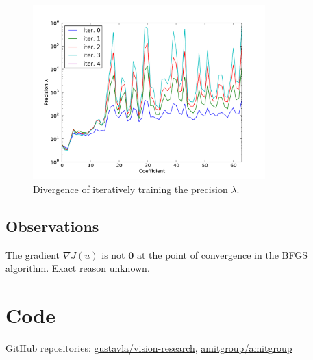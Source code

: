 \documentclass{article}
\begin{document}
\begin{figure}
    \centering
    \includegraphics[width=0.8\textwidth]{figs/itercoefs.pdf}
    \caption{Divergence of iteratively training the precision $\lambda$.} \label{fig:itercoefs}
\end{figure}

\subsection{Observations}
The gradient $\nabla J(u)$ is not $\mathbf{0}$ at the point of convergence in the BFGS algorithm. Exact reason unknown.

\section{Code}
GitHub repositories: \href{https://github.com/gustavla/vision-research/}{gustavla/vision-research}, \href{https://github.com/amitgroup/amitgroup}{amitgroup/amitgroup}
\end{document}
